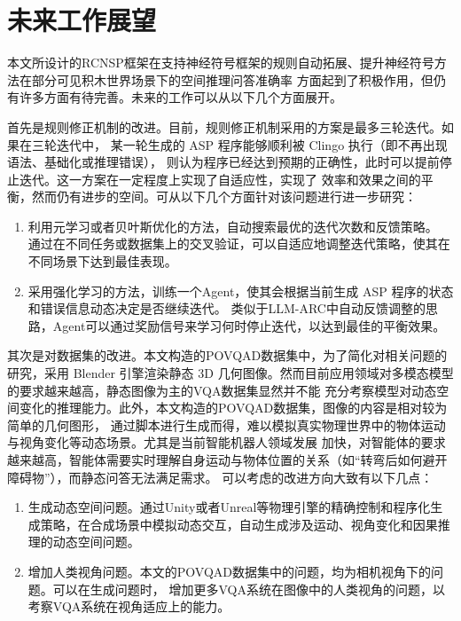 \section{未来工作展望}
本文所设计的RCNSP框架在支持神经符号框架的规则自动拓展、提升神经符号方法在部分可见积木世界场景下的空间推理问答准确率
方面起到了积极作用，但仍有许多方面有待完善。未来的工作可以从以下几个方面展开。

首先是规则修正机制的改进。目前，规则修正机制采用的方案是最多三轮迭代。如果在三轮迭代中，
某一轮生成的 ASP 程序能够顺利被 Clingo 执行（即不再出现语法、基础化或推理错误），
则认为程序已经达到预期的正确性，此时可以提前停止迭代。这一方案在一定程度上实现了自适应性，实现了
效率和效果之间的平衡，然而仍有进步的空间。可从以下几个方面针对该问题进行进一步研究：
\begin{enumerate}[nosep]
    \item 利用元学习或者贝叶斯优化的方法，自动搜索最优的迭代次数和反馈策略。
通过在不同任务或数据集上的交叉验证，可以自适应地调整迭代策略，使其在不同场景下达到最佳表现。
    \item 采用强化学习的方法，训练一个Agent，使其会根据当前生成 ASP 程序的状态和错误信息动态决定是否继续迭代。
类似于LLM-ARC中自动反馈调整的思路，Agent可以通过奖励信号来学习何时停止迭代，以达到最佳的平衡效果\cite{kalyanpur2024llmarcenhancingllmsautomated}。
\end{enumerate}

其次是对数据集的改进。本文构造的POVQAD数据集中，为了简化对相关问题的研究，采用 Blender 引擎渲染静态 3D 几何图像。然而目前应用领域对多模态模型的要求越来越高，静态图像为主的VQA数据集显然并不能
充分考察模型对动态空间变化的推理能力。此外，本文构造的POVQAD数据集，图像的内容是相对较为简单的几何图形，
通过脚本进行生成而得，难以模拟真实物理世界中的物体运动与视角变化等动态场景。尤其是当前智能机器人领域发展
加快，对智能体的要求越来越高，智能体需要实时理解自身运动与物体位置的关系（如“转弯后如何避开障碍物”），而静态问答无法满足需求。
可以考虑的改进方向大致有以下几点：
\begin{enumerate}[nosep]
    \item 生成动态空间问题。通过Unity或者Unreal等物理引擎的精确控制和程序化生成策略，在合成场景中模拟动态交互，自动生成涉及运动、视角变化和因果推理的动态空间问题。
    \item 增加人类视角问题。本文的POVQAD数据集中的问题，均为相机视角下的问题。可以在生成问题时，
增加更多VQA系统在图像中的人类视角的问题，以考察VQA系统在视角适应上的能力。
\end{enumerate}